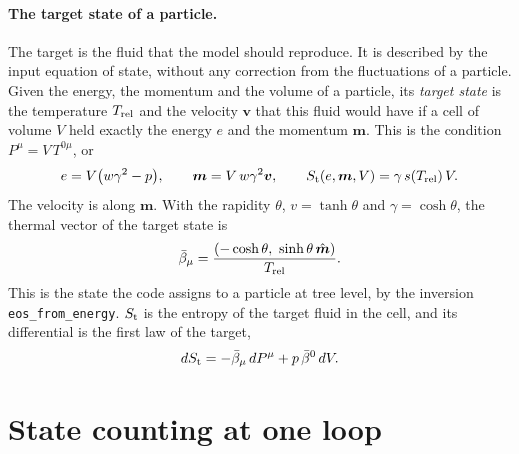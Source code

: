 \documentclass[11pt,aps,preprint,nofootinbib,superscriptaddress,tightenlines]{revtex4-2}
\def\st{\begin{equation}}
\def\stp{\end{equation}}
\let\oldparagraph\paragraph
\renewcommand{\paragraph}{\par\bigskip\oldparagraph}
\begin{document}
\paragraph{The target state of a particle.}  The target is the fluid that the model should reproduce.  It is described by the input equation of state, without any
correction from the fluctuations of a particle.  Given the energy, the momentum and the volume of a particle, its \emph{target state} is the
temperature $T_{\rm rel}$ and the velocity $\bm v$ that this fluid would have if a cell of volume $V$ held exactly the energy $e$ and the momentum
$\bm m$.  This is the condition $P^\mu=V\,T^{0\mu}$, or
\st
e=V\big(w\gamma^2-p\big),\qquad \bm m=V\,w\gamma^2\bm v,\qquad S_{\rm t}(e,\bm m,V)=\gamma\,s(T_{\rm rel})\,V .
\label{targetstate}
\stp
The velocity is along $\bm m$.  With the rapidity $\theta$, $v=\tanh\theta$ and $\gamma=\cosh\theta$, the thermal vector of the target state is
\st
\bar\beta_\mu=\frac{(-\cosh\theta,\ \sinh\theta\,\hat{\bm m})}{T_{\rm rel}} .
\stp
This is the state the code assigns to a particle at tree level, by the
inversion \texttt{eos\_from\_energy}.  $S_{\rm t}$ is the entropy of the target fluid in the cell, and its differential is the first law of the target,
\st
dS_{\rm t}=-\bar\beta_\mu\,dP^\mu+p\,\bar\beta^0\,dV .
\stp

\section{State counting at one loop}
\label{sec:oneloop}
\end{document}
